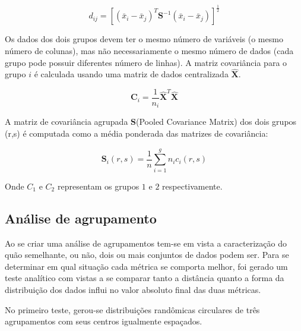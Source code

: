 \begin{equation}
d_{ij}=[(\bar{x}_{i}-\bar{x}_{j})^{T}\textbf{S}^{-1}(\bar{x}_{i}-\bar{x}_{j})]^{\frac{1}{2}}
\end{equation}

Os dados dos dois grupos devem ter o mesmo número de variáveis (o mesmo número de colunas), mas não necessariamente o mesmo número de dados (cada grupo pode possuir diferentes número de linhas). A matriz covariância para o grupo $i$ é calculada usando uma matriz de dados centralizada $\hat{\textbf{X}}$.


\begin{equation}
\textbf{C}_{i}=\dfrac{1}{n_{i}} \hat{\textbf{X}}^{T}\hat{\textbf{X}}
\end{equation}

A matriz de covariância agrupada $\textbf{S}$(Pooled Covariance Matrix) dos dois grupos (r,s) é computada como a média ponderada das matrizes de covariância:

\begin{equation}
\textbf{S}_{i}(r,s)=\dfrac{1}{n}\sum^{g}_{i=1}n_{i}c_{i}(r,s)
\end{equation}

Onde $C_{1}$ e $C_{2}$ representam os grupos $1$ e $2$ respectivamente.


\subsection{Análise de agrupamento}

Ao se criar uma análise de agrupamentos tem-se em vista a caracterização do quão semelhante, ou não, dois ou mais conjuntos de dados podem ser.  Para se determinar em qual situação cada métrica se comporta melhor, foi gerado um teste analítico com vistas a se comparar tanto a distância quanto a forma da distribuição dos dados influi no valor absoluto final das duas métricas. 

No primeiro teste, gerou-se distribuições randômicas circulares de três agrupamentos com seus centros igualmente espaçados. 

